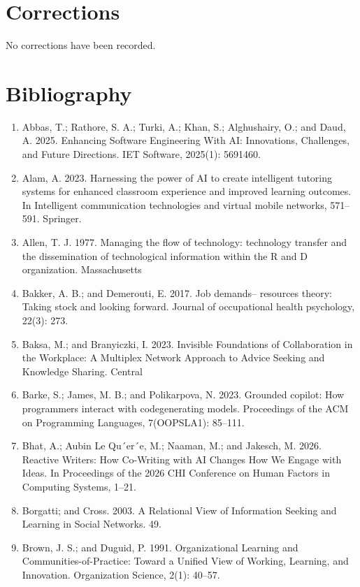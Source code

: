 \documentclass[11pt]{article}
\begin{document}
\section*{Corrections}
No corrections have been recorded.

\section*{Bibliography}
\begin{enumerate}[leftmargin=*]
  \item Abbas, T.; Rathore, S. A.; Turki, A.; Khan, S.; Alghushairy, O.; and Daud, A. 2025. Enhancing Software Engineering With AI: Innovations, Challenges, and Future Directions. IET Software, 2025(1): 5691460.
  \item Alam, A. 2023. Harnessing the power of AI to create intelligent tutoring systems for enhanced classroom experience and improved learning outcomes. In Intelligent communication technologies and virtual mobile networks, 571–591. Springer.
  \item Allen, T. J. 1977. Managing the flow of technology: technology transfer and the dissemination of technological information within the R and D organization. Massachusetts
  \item Bakker, A. B.; and Demerouti, E. 2017. Job demands– resources theory: Taking stock and looking forward. Journal of occupational health psychology, 22(3): 273.
  \item Baksa, M.; and Branyiczki, I. 2023. Invisible Foundations of Collaboration in the Workplace: A Multiplex Network Approach to Advice Seeking and Knowledge Sharing. Central
  \item Barke, S.; James, M. B.; and Polikarpova, N. 2023. Grounded copilot: How programmers interact with codegenerating models. Proceedings of the ACM on Programming Languages, 7(OOPSLA1): 85–111.
  \item Bhat, A.; Aubin Le Qu´er´e, M.; Naaman, M.; and Jakesch, M. 2026. Reactive Writers: How Co-Writing with AI Changes How We Engage with Ideas. In Proceedings of the 2026 CHI Conference on Human Factors in Computing Systems, 1–21.
  \item Borgatti; and Cross. 2003. A Relational View of Information Seeking and Learning in Social Networks. 49.
  \item Brown, J. S.; and Duguid, P. 1991. Organizational Learning and Communities-of-Practice: Toward a Unified View of Working, Learning, and Innovation. Organization Science, 2(1): 40–57.

\end{enumerate}
\end{document}
